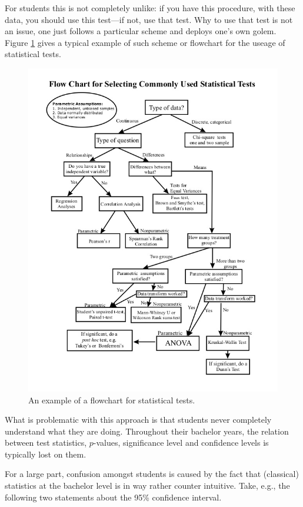 \documentclass[fleqn,10pt]{SelfArx} %
\begin{document}
For students this is not completely unlike: if you have this procedure, with
these data, you should use this test---if not, use that test. Why to use that test is
not an issue, one just follows a particular scheme and deploys one's own golem.
Figure \ref{fig:flowchart} gives a typical example of such scheme or flowchart
for the useage of statistical tests.
\begin{figure}[t!]\centering 
  \includegraphics[width=\columnwidth]{./figures/flowchart.jpg}
  \caption{An example of a flowchart for statistical tests.}
	\label{fig:flowchart}
\end{figure}
What is problematic with this approach is that students never completely understand what
they are doing. Throughout their bachelor years, the relation between test
statistics, $p$-values, significance level and confidence levels is typically
lost on them.

For a large part, confusion amongst students is caused by the fact that
(classical) statistics at the bachelor level is in way rather counter intuitive.
Take, e.g., the following two statements about the 95\% confidence interval.
\end{document}
